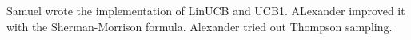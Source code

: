 \documentclass[a4paper, 11pt]{article}
\begin{document}
Samuel wrote the implementation of LinUCB and UCB1. ALexander improved it with the Sherman-Morrison formula. Alexander tried out Thompson sampling.




\end{document}

